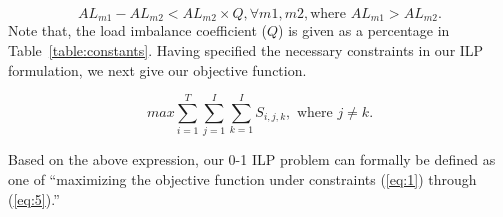 \begin{equation}
AL_{m1} - AL_{m2} < AL_{m2} \times Q,\forall{m1,m2},\mbox{where $AL_{m1} > AL_{m2}$}.
\label{eq:4}
\end{equation}
Note that, the load imbalance coefficient ($Q$) is given as a percentage in Table~\ref{table:constants}. Having specified the necessary constraints in our ILP formulation, we next give our objective function.

\begin{equation}
max \sum_{i=1}^{T}\sum_{j=1}^{I}\sum_{k=1}^{I} S_{i,j,k}, \mbox{ where $j\ne k$}.
\label{eq:5}
\end{equation}

Based on the above expression, our 0-1 ILP problem can formally be defined as one of ``maximizing
the objective function under constraints (\ref{eq:1}) through (\ref{eq:5}).'' 